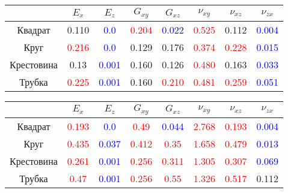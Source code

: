 \documentclass{beamer}
\begin{document}
{%
\begin{center}
    \begin{tabular}{|c|c|c|c|c|c|c|c|}
        \hline
         & $E_x$ & $E_z$ & $G_{xy}$ & $G_{xz}$ & $\nu_{xy}$ & $\nu_{xz}$ & $\nu_{zx}$  \\
        \hline
    Квадрат & 0.110 & \textcolor{blue}{0.0} & \textcolor{red}{0.204} & \textcolor{blue}{0.022} & \textcolor{red}{0.525} & 0.112 & \textcolor{blue}{0.004} \\
        \hline
        Круг & \textcolor{red}{0.216} & \textcolor{blue}{0.0} &   0.129 & 0.176 & \textcolor{red}{0.374} & \textcolor{red}{0.228} & \textcolor{blue}{0.015} \\
        \hline
        Крестовина & 0.13 &\textcolor{blue}{0.001} & 0.160 & 0.126 & \textcolor{red}{0.480} & 0.163 & \textcolor{blue}{0.033} \\
        \hline
        Трубка &  \textcolor{red}{0.225} & \textcolor{blue}{0.001} & 0.160 & \textcolor{red}{0.210} & \textcolor{red}{0.481} & \textcolor{red}{0.259} & \textcolor{blue}{0.051} \\
        \hline
    \end{tabular}
\end{center}
\begin{center}
    \begin{tabular}{|c|c|c|c|c|c|c|c|}
        \hline
         & $E_x$ & $E_z$ & $G_{xy}$ & $G_{xz}$ & $\nu_{xy}$ & $\nu_{xz}$ & $\nu_{zx}$  \\
        \hline
        Квадрат & \textcolor{red}{0.193} & \textcolor{blue}{0.0} & \textcolor{red}{0.49} & \textcolor{blue}{0.044} & \textcolor{red}{2.768} & \textcolor{red}{0.193} & \textcolor{blue}{0.004} \\
        \hline
        Круг & \textcolor{red}{0.435} & \textcolor{blue}{0.037} & \textcolor{red}{0.412} & \textcolor{red}{0.35} & \textcolor{red}{1.658} & \textcolor{red}{0.479} & \textcolor{blue}{0.013} \\
        \hline
        Крестовина & \textcolor{red}{0.261} & \textcolor{blue}{0.001} & \textcolor{red}{0.256} & \textcolor{red}{0.311} & \textcolor{red}{1.305} & \textcolor{red}{0.307} & \textcolor{blue}{0.069} \\
        \hline
        Трубка & \textcolor{red}{0.47} & \textcolor{blue}{0.001} & \textcolor{red}{0.256} & \textcolor{red}{0.55} & \textcolor{red}{1.326} & \textcolor{red}{0.517} & 0.112 \\
        \hline
    \end{tabular}
\end{center}
}
\end{document}
